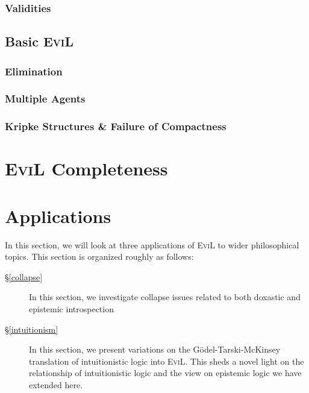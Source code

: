 \documentclass[11pt]{article}
\numberwithin{equation}{subsection}
\begin{document}
\subsubsection{Validities}
\label{validities}

\subsection{Basic \textsc{EviL}}
\label{dead-by-dawn}
\subsubsection{Elimination}
\label{elimination}

\subsubsection{Multiple Agents}\label{multi-agent}

\subsubsection{Kripke Structures \& Failure of Compactness}
\label{kripke} 
\label{non-compactness}

\section{\textsc{EviL} Completeness}\label{army-of-darkness}


\section{Applications}\label{applications}
In this section, we will look at three applications of \textsc{EviL}
to wider philosophical topics.  This section is organized roughly as
follows:

\begin{description}
\item[\S\ref{collapse}] In this section, we investigate collapse issues
  related to both doxastic and  epistemic introspection 
\item[\S\ref{intuitionism}]  In this section, we present variations on
  the G\"{o}del-Tarski-McKinsey translation of intuitionistic logic
  into \textsc{EviL}.  This sheds a novel light on the relationship of
  intuitionistic logic and the view on epistemic logic we have
  extended here.
\end{description}
\end{document}
